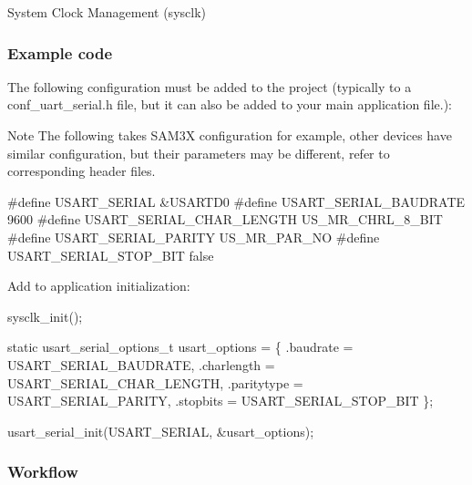 \begin{DoxyEnumerate}
\item System Clock Management (sysclk)
\end{DoxyEnumerate}\hypertarget{serial_use_case_1_serial_use_case_1_setup_code}{}\subsubsection{Example code}\label{serial_use_case_1_serial_use_case_1_setup_code}
The following configuration must be added to the project (typically to a conf\+\_\+uart\+\_\+serial.\+h file, but it can also be added to your main application file.)\+:

\begin{DoxyNote}{Note}
The following takes S\+A\+M3\+X configuration for example, other devices have similar configuration, but their parameters may be different, refer to corresponding header files.
\end{DoxyNote}

\begin{DoxyCode}
\textcolor{preprocessor}{#define USART\_SERIAL                     &USARTD0}
\textcolor{preprocessor}{#define USART\_SERIAL\_BAUDRATE            9600}
\textcolor{preprocessor}{#define USART\_SERIAL\_CHAR\_LENGTH         US\_MR\_CHRL\_8\_BIT}
\textcolor{preprocessor}{#define USART\_SERIAL\_PARITY              US\_MR\_PAR\_NO}
\textcolor{preprocessor}{#define USART\_SERIAL\_STOP\_BIT            false}
\end{DoxyCode}


Add to application initialization\+: 
\begin{DoxyCode}
sysclk\_init();

\textcolor{keyword}{static} usart\_serial\_options\_t usart\_options = \{
   .baudrate = USART\_SERIAL\_BAUDRATE,
   .charlength = USART\_SERIAL\_CHAR\_LENGTH,
   .paritytype = USART\_SERIAL\_PARITY,
   .stopbits = USART\_SERIAL\_STOP\_BIT
\};

usart\_serial\_init(USART\_SERIAL, &usart\_options);
\end{DoxyCode}
\hypertarget{serial_use_case_1_serial_use_case_1_setup_flow}{}\subsubsection{Workflow}\label{serial_use_case_1_serial_use_case_1_setup_flow}

